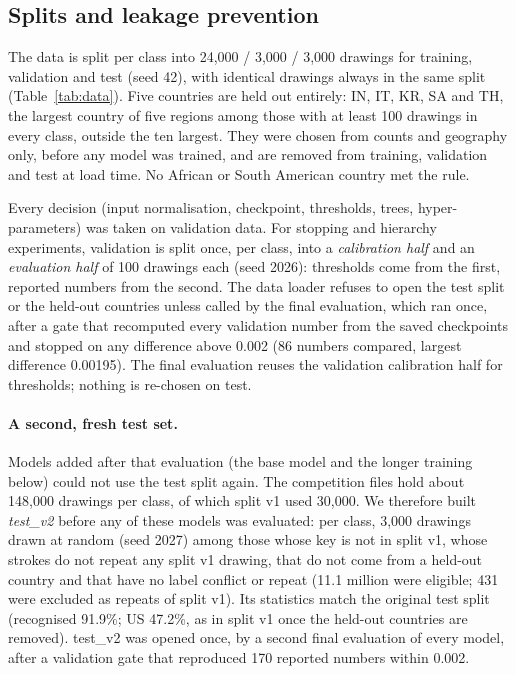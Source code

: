 \subsection{Splits and leakage prevention}
\label{sec:setup-splits}
The data is split per class into 24{,}000 / 3{,}000 / 3{,}000 drawings for training, validation and
test (seed 42), with identical drawings always in the same split (Table~\ref{tab:data}). Five
countries are held out entirely: IN, IT, KR, SA and TH, the largest country of five regions among
those with at least 100 drawings in every class, outside the ten largest. They were chosen from
counts and geography only, before any model was trained, and are removed from training,
validation and test at load time. No African or South American country met the rule.



Every decision (input normalisation, checkpoint, thresholds, trees, hyper-parameters) was taken
on validation data. For stopping and hierarchy experiments, validation is split once, per class,
into a \emph{calibration half} and an \emph{evaluation half} of 100 drawings each (seed 2026):
thresholds come from the first, reported numbers from the second. The data loader refuses to open
the test split or the held-out countries unless called by the final evaluation, which ran once,
after a gate that recomputed every validation number from the saved checkpoints and stopped on
any difference above 0.002 (86 numbers compared, largest difference 0.00195). The final
evaluation reuses the validation calibration half for thresholds; nothing is re-chosen on test.

\paragraph{A second, fresh test set.} Models added after that evaluation (the base model and the
longer training below) could not use the test split again. The competition files hold about
148{,}000 drawings per class, of which split v1 used 30{,}000. We therefore built \emph{test\_v2}
before any of these models was evaluated: per class, 3{,}000 drawings drawn at random (seed 2027)
among those whose key is not in split v1, whose strokes do not repeat any split v1 drawing, that do
not come from a held-out country and that have no label conflict or repeat (11.1 million were
eligible; 431 were excluded as repeats of split v1). Its statistics match the original test split
(recognised 91.9\%; US 47.2\%, as in split v1 once the held-out countries are removed). test\_v2 was opened once, by a
second final evaluation of every model, after a validation gate that reproduced 170 reported
numbers within 0.002.

